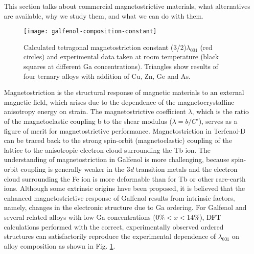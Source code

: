
	
This section talks about commercial magnetostrictive materials, what alternatives are available, why we study them, and what we can do with them. 

\begin{figure}[h] 
	\centering
	\texttt{[image: galfenol-composition-constant]}
	\caption{Calculated tetragonal magnetostriction constant (3/2)$\lambda_{001}$ (red circles) and experimental data taken at room temperature (black squares at different Ga concentrations). Triangles show results of four ternary alloys with addition of Cu, Zn, Ge and As. %
	}
	\label{fig:galfenol-composition-constant}		
\end{figure}

Magnetostriction \cite{Ueno2015a} is the structural response of magnetic materials to an external magnetic field, which arises due to the dependence of the magnetocrystalline anisotropy energy on strain. The magnetostrictive coefficient $\lambda$, which is the ratio of the magnetoelastic coupling b to the shear modulus ($\lambda = b/C'$), serves as a figure of merit for magnetostrictive performance. Magnetostriction in Terfenol-D can be traced back to the strong spin-orbit (magnetoelastic) coupling of the lattice to the anisotropic electron cloud surrounding the Tb ion. The understanding of magnetostriction in Galfenol is more challenging, because spin-orbit coupling is generally weaker in the 3\textit{d} transition metals and the electron cloud surrounding the Fe ion is more deformable than for Tb or other rare-earth ions. Although some extrinsic origins have been proposed, it is believed that the enhanced magnetostrictive response of Galfenol results from intrinsic factors, namely, changes in the electronic structure due to Ga ordering. For Galfenol and  several related alloys with low Ga concentrations ($0\% < x < 14\%$), DFT calculations performed with the correct, experimentally observed ordered structures can satisfactorily reproduce the experimental dependence of $\lambda_{001}$ on alloy composition as shown in Fig. \ref{fig:galfenol-composition-constant}. 

